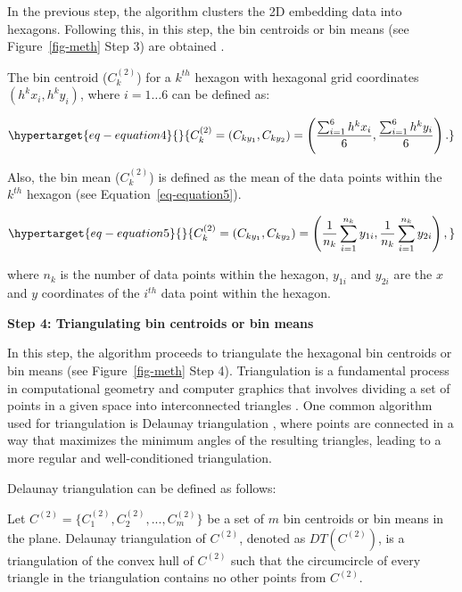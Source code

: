 \documentclass[
  12pt]{article}
\begin{document}
In the previous step, the algorithm clusters the 2D embedding data into
hexagons. Following this, in this step, the bin centroids or bin means
(see Figure~\ref{fig-meth} Step 3) are obtained \citep{Carr2013}.

The bin centroid (\(C_k^{(2)}\)) for a \(k^{th}\) hexagon with hexagonal
grid coordinates \((h^{k}x_{i}, h^{k}y_{i})\), where \(i = 1 \dots 6\)
can be defined as:

\begin{equation}\protect\hypertarget{eq-equation4}{}{
C_k^{(2)} = (C_{ky_1}, C_{ky_2}) = \left(\frac{\sum_{i=1}^{6} h^{k}x_{i}}{6}, \frac{\sum_{i=1}^{6} h^{k}y_{i}}{6}\right).
}\label{eq-equation4}\end{equation}

Also, the bin mean (\(C_k^{(2)}\)) is defined as the mean of the data
points within the \(k^{th}\) hexagon (see Equation~\ref{eq-equation5}).

\begin{equation}\protect\hypertarget{eq-equation5}{}{
C_k^{(2)} = (C_{ky_1}, C_{ky_2}) = \left(\frac{1}{n_k} \sum_{i=1}^{n_k} y_{1i}, \frac{1}{n_k} \sum_{i=1}^{n_k} y_{2i}\right),
}\label{eq-equation5}\end{equation}

where \(n_k\) is the number of data points within the hexagon,
\(y_{1i}\) and \(y_{2i}\) are the \(x\) and \(y\) coordinates of the
\(i^{th}\) data point within the hexagon.

\textbf{Step 4: Triangulating bin centroids or bin means}

In this step, the algorithm proceeds to triangulate the hexagonal bin
centroids or bin means (see Figure~\ref{fig-meth} Step 4). Triangulation
is a fundamental process in computational geometry and computer graphics
that involves dividing a set of points in a given space into
interconnected triangles \citep{article30}. One common algorithm used
for triangulation is Delaunay triangulation
\citep[\citet{article54}]{article26}, where points are connected in a
way that maximizes the minimum angles of the resulting triangles,
leading to a more regular and well-conditioned triangulation.

Delaunay triangulation can be defined as follows:

Let \(C^{(2)} = \{C_1^{(2)}, C_2^{(2)}, ..., C_m^{(2)}\}\) be a set of
\(m\) bin centroids or bin means in the plane. Delaunay triangulation of
\(C^{(2)}\), denoted as \(DT(C^{(2)})\), is a triangulation of the
convex hull of \(C^{(2)}\) such that the circumcircle of every triangle
in the triangulation contains no other points from \(C^{(2)}\).
\end{document}
